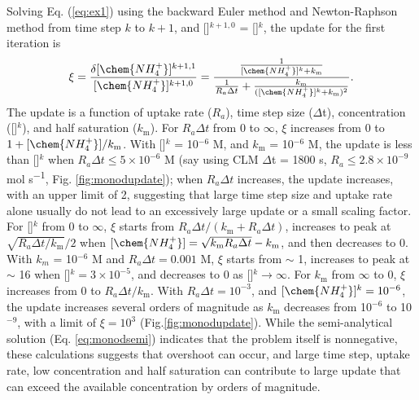 \documentclass[gmd, manuscript]{copernicus}
\begin{document}
Solving Eq. (\ref{eq:ex1}) using the backward Euler method and Newton-Raphson
method from time step $k$
to $k+1$, and []$^{k+1,0}$ = []$^k$, the update for
the first iteration is 
\begin{equation}
\xi = \frac{\delta [\chem{NH_4^+}]^{k+1,1}}{[\chem{NH_4^+}]^{k+1,0}} =
\frac{\frac{1}{[\chem{NH_4^+}]^{k}+k_\text{m}}}{\frac{1}{R_a
\Delta t}+\frac{k_\text{m}}{([\chem{NH_4^+}]^{k}+k_\text{m})^2}}.
\end{equation}
The update is a function of uptake rate ($R_a$), time step size ($\Delta$t),
concentration ([]$^k$), and half saturation ($k_\text{m}$).
For $R_a\Delta t$ from 0 to $\infty$, $\xi$
increases from 0 to $1 + [\chem{NH_4^+}]/k_\text{m}$.
With []$^k$ = 10$^{-6}$ \unit{M}, and $k_\text{m}$ = 10$^{-6}$ \unit{M},
the update is less than []$^k$ when $R_a\Delta t \leq 5 \times 10^{-6}$
\unit{M} (say using CLM $\Delta$t = 1800 \unit{s}, $R_a \leq 2.8\times10^{-9}$
\unit{mol} \unit{s^{-1}}, Fig. \ref{fig:monodupdate}); when $R_a\Delta t$
increases, the update increases, with an upper limit of 2,
suggesting that large time step size and uptake rate alone usually do not lead
to an excessively large update or a small scaling factor.  
For []$^k$ from 0 to $\infty$, $\xi$ starts from $R_a\Delta
t/(k_\text{m}+R_a\Delta t)$, increases to peak at $\sqrt{R_a\Delta
t/k_\text{m}}/2$ when $[\chem{NH_4^+}] = \sqrt{k_\text{m}R_a\Delta
t}-k_\text{m}$, and then decreases to 0. 
With $k_m$ = 10$^{-6}$ \unit{M} and $R_a\Delta t=0.001$ \unit{M}, $\xi$ starts
from $\sim$ 1, increases to peak at $\sim$ 16 when []$^k = 3
\times 10^{-5}$, and decreases to 0 as []$^k \rightarrow \infty$.
For $k_\text{m}$ from $\infty$ to 0, $\xi$ increases from 0 to $R_a\Delta
t/k_\text{m}$. With $R_a\Delta t = 10^{-3}$, and $[\chem{NH_4^+}]^k = 10^{-6}$, 
the update increases several orders of magnitude as $k_\text{m}$ decreases from 10$^{-6}$
to 10$^{-9}$, with a limit of $\xi = 10^{3}$ (Fig.\ref{fig:monodupdate}). 
While the semi-analytical solution (Eq.
\ref{eq:monodsemi}) indicates that the problem itself is nonnegative, these
calculations suggests that overshoot can occur, and large time step, uptake
rate, low concentration and half saturation can contribute to large update that
can exceed the available concentration by orders of magnitude.
\end{document}
